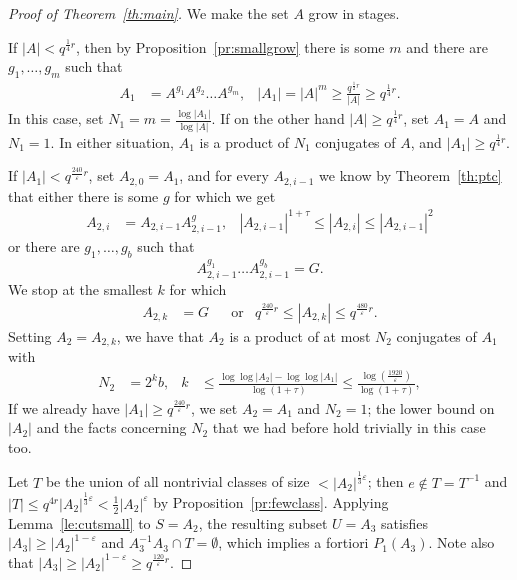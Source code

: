 \documentclass[a4paper]{article}
\theoremstyle{definition}
\numberwithin{equation}{section}
\begin{document}
\begin{proof}[Proof of Theorem~\ref{th:main}]
We make the set $A$ grow in stages.

If $|A|<q^{\frac{1}{4}r}$, then by Proposition~\ref{pr:smallgrow} there is some $m$ and there are $g_{1},\ldots,g_{m}$ such that
\begin{align*}
A_{1} & =A^{g_{1}}A^{g_{2}}\ldots A^{g_{m}}, & |A_{1}|=|A|^{m}\geq\frac{q^{\frac{1}{2}r}}{|A|}\geq q^{\frac{1}{4}r}.
\end{align*}
In this case, set $N_{1}=m=\frac{\log|A_{1}|}{\log|A|}$. If on the other hand $|A|\geq q^{\frac{1}{4}r}$, set $A_{1}=A$ and $N_{1}=1$. In either situation, $A_{1}$ is a product of $N_{1}$ conjugates of $A$, and $|A_{1}|\geq q^{\frac{1}{4}r}$.

If $|A_{1}|<q^{\frac{240}{\varepsilon}r}$, set $A_{2,0}=A_{1}$, and for every $A_{2,i-1}$ we know by Theorem~\ref{th:ptc} that either there is some $g$ for which we get
\begin{align*}
A_{2,i} & =A_{2,i-1}A_{2,i-1}^{g}, & |A_{2,i-1}|^{1+\tau}\leq|A_{2,i}|\leq|A_{2,i-1}|^{2}
\end{align*}
or there are $g_{1},\ldots,g_{b}$ such that
\begin{equation*}
A_{2,i-1}^{g_{1}}\ldots A_{2,i-1}^{g_{b}}=G.
\end{equation*}
We stop at the smallest $k$ for which
\begin{align*}
A_{2,k} & =G & & \text{or} & q^{\frac{240}{\varepsilon}r}\leq|A_{2,k}|\leq q^{\frac{480}{\varepsilon}r}.
\end{align*}
Setting $A_{2}=A_{2,k}$, we have that $A_{2}$ is a product of at most $N_{2}$ conjugates of $A_{1}$ with
\begin{align*}
N_{2} & =2^{k}b, & k & \leq\frac{\log\log|A_{2}|-\log\log|A_{1}|}{\log(1+\tau)}\leq\frac{\log\left(\frac{1920}{\varepsilon}\right)}{\log(1+\tau)},
\end{align*}
If we already have $|A_{1}|\geq q^{\frac{240}{\varepsilon}r}$, we set $A_{2}=A_{1}$ and $N_{2}=1$; the lower bound on $|A_{2}|$ and the facts concerning $N_{2}$ that we had before hold trivially in this case too.

Let $T$ be the union of all nontrivial classes of size $<|A_{2}|^{\frac{1}{3}\varepsilon}$; then $e\notin T=T^{-1}$ and $|T|\leq q^{4r}|A_{2}|^{\frac{1}{3}\varepsilon}<\frac{1}{2}|A_{2}|^{\varepsilon}$ by Proposition~\ref{pr:fewclass}. Applying Lemma~\ref{le:cutsmall} to $S=A_{2}$, the resulting subset $U=A_{3}$ satisfies $|A_{3}|\geq|A_{2}|^{1-\varepsilon}$ and $A_{3}^{-1}A_{3}\cap T=\emptyset$, which implies a fortiori $P_{1}(A_{3})$. Note also that $|A_{3}|\geq|A_{2}|^{1-\varepsilon}\geq q^{\frac{120}{\varepsilon}r}$.


\end{proof}
\end{document}

